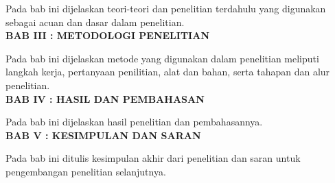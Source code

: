 Pada bab ini dijelaskan teori-teori dan penelitian terdahulu yang digunakan sebagai acuan dan dasar dalam penelitian.\\

\noindent
\textbf{BAB III : METODOLOGI PENELITIAN}

Pada bab ini dijelaskan metode yang digunakan dalam penelitian meliputi langkah kerja, pertanyaan penilitian, alat dan bahan, serta tahapan dan alur penelitian.\\

\noindent
\textbf{BAB IV : HASIL DAN PEMBAHASAN}

Pada bab ini dijelaskan hasil penelitian dan pembahasannya.\\

\noindent
\textbf{BAB V : KESIMPULAN DAN SARAN}

Pada bab ini ditulis kesimpulan akhir dari penelitian dan saran untuk pengembangan penelitian selanjutnya.\\

\begin{comment}

\end{comment}
